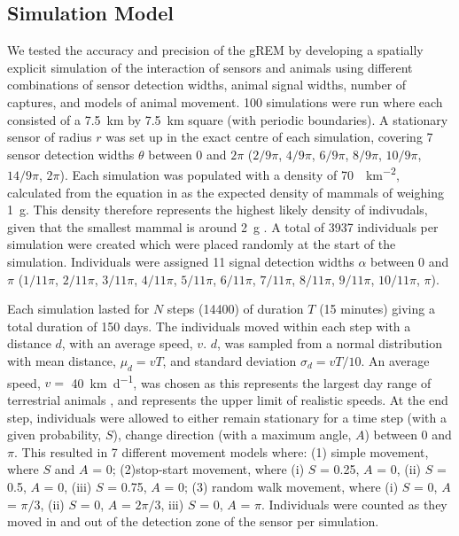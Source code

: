 \documentclass[a4paper,10pt,reqno,oneside]{amsart}
\begin{document}
\subsection{Simulation Model}

We tested the accuracy and precision of the gREM by developing a spatially explicit simulation of the interaction of sensors and animals using different combinations of sensor detection widths, animal signal widths, number of captures, and models of animal movement. 100 simulations were run where each consisted of a  \SI{7.5}{\kilo\meter} by \SI{7.5}{\kilo\meter} square (with periodic boundaries). A stationary sensor of radius $r$ was set up in the exact centre of each simulation, covering 7 sensor detection widths $\theta$ between 0 and $2\pi$ ($2/9\pi$, $4/9\pi$, $6/9\pi$, $8/9\pi$, $10/9\pi$, $14/9\pi$, $2\pi$). Each simulation was populated with a density of \SI{70}{\animals\per\kilo\meter\squared}, calculated from the equation in \cite{damuth1981population} as the expected density of mammals of weighing \SI{1}{\gram}. This density therefore represents the highest likely density of indivudals, given that the smallest mammal is around \SI{2}{\gram} \cite{jones2009pantheria}. A total of 3937 individuals per simulation were created which were placed randomly at the start of the simulation. Individuals were assigned 11 signal detection widths $\alpha$ between 0 and $\pi$ ($1/11\pi$, $2/11\pi$, $3/11\pi$, $4/11\pi$, $5/11\pi$, $6/11\pi$, $7/11\pi$, $8/11\pi$, $9/11\pi$, $10/11\pi$, $\pi$).

Each simulation lasted for $N$ steps (14400) of duration $T$ (15 minutes) giving a total duration of 150 days. The individuals moved within each step with a distance $d$, with an average speed, $v$. $d$, was sampled from a normal distribution with mean distance, $\mu_d = vT$, and standard deviation $\sigma_d = vT/10$. An average speed, $v = $ \SI{40}{\kilo\meter \per \day}, was chosen as this represents the largest day range of terrestrial animals \citep{carbone2005far}, and represents the upper limit of realistic speeds. At the end step, individuals were allowed to either remain stationary for a time step (with a given probability, $S$), change direction (with a maximum angle, $A$) between 0 and $\pi$. This resulted in 7 different movement models where: (1) simple movement, where $S$ and $A$ = 0; (2)stop-start movement, where (i) $S$ = 0.25, $A$ = 0, (ii) $S$ = 0.5, $A$ = 0, (iii) $S$ = 0.75, $A$ = 0; (3) random walk movement, where (i) $S$ = 0, $A$ = $\pi/3$, (ii) $S$ = 0, $A$ = $2\pi/3$, iii) $S$ = 0, $A$ = $\pi$. Individuals were counted as they moved in and out of the detection zone of the sensor per simulation. 
\end{document}
